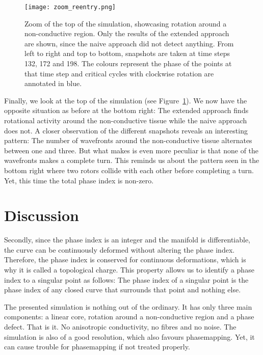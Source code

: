 \documentclass[twocolumn]{article}
\begin{document}
\begin{figure}[ht]
  \centering
  \texttt{[image: zoom\_reentry.png]}
  \caption{Zoom of the top of the simulation, showcasing rotation around a
    non-conductive region. Only the results of the extended approach are
    shown, since the naive approach did not detect anything. From left to
    right and top to bottom, snapshots are taken at time steps 132, 172 and
    198. The colours represent the phase of the points at that time step and
  critical cycles with clockwise rotation are annotated in blue.}
  \label{fig:zoom-reentry}
\end{figure}

Finally, we look at the top of the simulation (see
Figure~\ref{fig:zoom-reentry}). We now have the opposite situation as
before at the bottom right: The extended approach finds rotational
activity around the non-conductive tissue while the naive approach does
not. A closer observation of the different snapshots reveals an
interesting pattern: The number of wavefronts around the non-conductive
tissue alternates between one and three. But what makes is even more
peculiar is that none of the wavefronts makes a complete turn. This
reminds us about the pattern seen in the bottom right where two rotors
collide with each other before completing a turn. Yet, this time the
total phase index is non-zero.

\section{Discussion}\label{discussion}

Secondly, since the phase index is an integer and the manifold is
differentiable, the curve can be continuously deformed without altering
the phase index. Therefore, the phase index is conserved for continuous
deformations, which is why it is called a topological charge. This
property allows us to identify a phase index to a singular point as
follows: The phase index of a singular point is the phase index of any
closed curve that surrounds that point and nothing else.

The presented simulation is nothing out of the ordinary. It has only
three main components: a linear core, rotation around a non-conductive
region and a phase defect. That is it. No anisotropic conductivity, no
fibres and no noise. The simulation is also of a good resolution, which
also favours phasemapping. Yet, it can cause trouble for phasemapping if
not treated properly.
\end{document}
